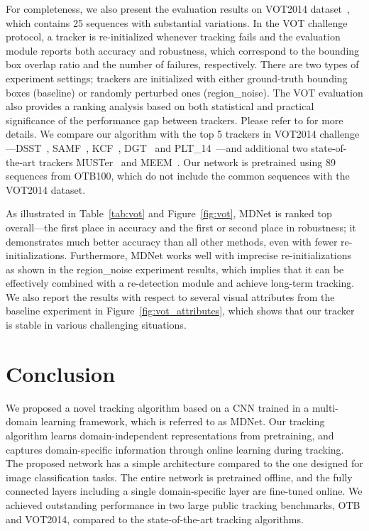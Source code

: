 \documentclass[10pt,twocolumn,letterpaper]{article}
\begin{document}
For completeness, we also present the evaluation results on VOT2014 dataset~\cite{vot14}, which contains 25 sequences with substantial variations. 
In the VOT challenge protocol, a tracker is re-initialized whenever tracking fails and the evaluation module reports both accuracy and robustness, which correspond to the bounding box overlap ratio and the number of failures, respectively.
There are two types of experiment settings; trackers are initialized with either ground-truth bounding boxes (baseline) or randomly perturbed ones (region\_noise).
The VOT evaluation also provides a ranking analysis based on both statistical and practical significance of the performance gap between trackers. 
Please refer to \cite{vot14} for more details.
We compare our algorithm with the top 5 trackers in VOT2014 challenge---DSST~\cite{danelljan2014accurate}, SAMF~\cite{li2014scale}, KCF~\cite{henriques2015high}, DGT~\cite{cai2013structured} and PLT\_14~\cite{vot14}---and additional two state-of-the-art trackers MUSTer~\cite{hong2015multi} and MEEM~\cite{zhang2014meem}.
Our network is pretrained using 89 sequences from OTB100, which do not include the common sequences with the VOT2014 dataset.
 
As illustrated in Table~\ref{tab:vot} and Figure~\ref{fig:vot}, MDNet is ranked top overall---the first place in accuracy and the first or second place in robustness; it demonstrates much better accuracy than all other methods, even with fewer re-initializations.
Furthermore, MDNet works well with imprecise re-initializations as shown in the region\_noise experiment results, which implies that it can be effectively combined with a re-detection module and achieve long-term tracking.
We also report the results with respect to several visual attributes from the baseline experiment in Figure~\ref{fig:vot_attributes}, which shows that our tracker is stable in various challenging situations.


\section{Conclusion}
\label{sec:conclusion}
We proposed a novel tracking algorithm based on a CNN trained in a multi-domain learning framework, which is referred to as MDNet.
Our tracking algorithm learns domain-independent representations from pretraining, and captures domain-specific information through online learning during tracking.
The proposed network has a simple architecture compared to the one designed for image classification tasks.
The entire network is pretrained offline, and the fully connected layers including a single domain-specific layer are fine-tuned online.
We achieved outstanding performance in two large public tracking benchmarks, OTB and VOT2014, compared to the state-of-the-art tracking algorithms.

{\small


}
\end{document}
